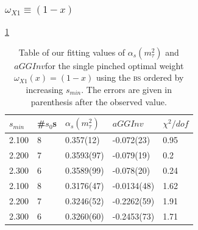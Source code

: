 \documentclass[../../index.tex]{subfiles}
\begin{document}
\subsubsection{\(\omega_{X1} \equiv (1-x)\)}
\cref{table:fitOpt10AlD4}
\begin{table}
  \centering
  \begin{tabular}{lllll}
    \toprule
    \(s_{min}\) & \#\(s_0\)s & \(\alpha_s(m_\tau^2)\) & \(aGGInv\) & \(\chi^2/dof\)  \\
    \midrule
    2.100 & 8  & 0.357(12) & -0.072(23) & 0.95 \\
    2.200 & 7  & 0.3593(97) & -0.079(19) & 0.2 \\
    2.300 & 6  & 0.3589(99) & -0.078(20) & 0.24 \\
    \midrule     
    2.100 & 8 & 0.3176(47) & -0.0134(48) & 1.62 \\
    2.200 & 7 & 0.3246(52) & -0.2262(59) & 1.91 \\
    2.300 & 6 & 0.3260(60) & -0.2453(73) & 1.71 \\
    \bottomrule
  \end{tabular}
  \caption{Table of our fitting values of \(\alpha_s(m_\tau^2)\) and
    \(aGGInv\)for the single pinched optimal weight
    \(\omega_{X1}(x)=(1-x)\) using the \textsc{bs} ordered by increasing
    \(s_{min}\). The errors are given in parenthesis after the observed value.}
  \label{table:fitOpt10AlD4}
\end{table}
\end{document}
